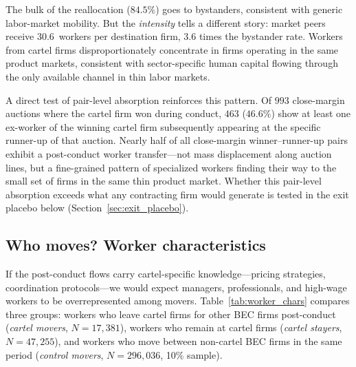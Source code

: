 The bulk of the reallocation ($84.5\%$) goes to bystanders, consistent with generic labor-market mobility. But the \emph{intensity} tells a different story: market peers receive $30.6$~workers per destination firm, $3.6$ times the bystander rate. Workers from cartel firms disproportionately concentrate in firms operating in the same product markets, consistent with sector-specific human capital flowing through the only available channel in thin labor markets.

A direct test of pair-level absorption reinforces this pattern. Of $993$ close-margin auctions where the cartel firm won during conduct, $463$ ($46.6\%$) show at least one ex-worker of the winning cartel firm subsequently appearing at the specific runner-up of that auction. Nearly half of all close-margin winner--runner-up pairs exhibit a post-conduct worker transfer---not mass displacement along auction lines, but a fine-grained pattern of specialized workers finding their way to the small set of firms in the same thin product market. Whether this pair-level absorption exceeds what any contracting firm would generate is tested in the exit placebo below (Section~\ref{sec:exit_placebo}).


\subsection{Who moves? Worker characteristics}\label{sec:who_moves}

If the post-conduct flows carry cartel-specific knowledge---pricing strategies, coordination protocols---we would expect managers, professionals, and high-wage workers to be overrepresented among movers. Table~\ref{tab:worker_chars} compares three groups: workers who leave cartel firms for other BEC firms post-conduct (\emph{cartel movers}, $N = 17{,}381$), workers who remain at cartel firms (\emph{cartel stayers}, $N = 47{,}255$), and workers who move between non-cartel BEC firms in the same period (\emph{control movers}, $N = 296{,}036$, 10\% sample).

